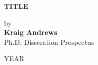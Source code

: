 \setcounter{page}{1}
\thispagestyle{empty}
\begin{titlepage}

	\begin{center}

	\singlespacing
	\textbf{TITLE}\\
	\doublespacing
	
	by\\
	
	\textbf{Kraig Andrews}\\
	Ph.D. Disseration Prospectus\\ 
	\vspace{1.0cm}

	YEAR\\
	\end{center}
	
	\begin{flushright}

   \vspace{1.0cm}
	 \\
   \vspace{0.7cm}
	\makebox[8.7cm][l]{$\overline {\hspace{7.8cm}}$} \\
   \vspace{0.9cm}
	\makebox[8.7cm][l]{$\overline {\hspace{7.8cm}}$} \\
   \vspace{0.9cm}
	\makebox[8.7cm][l]{$\overline {\hspace{7.8cm}}$} \\
	\end{flushright}
\end{titlepage}
